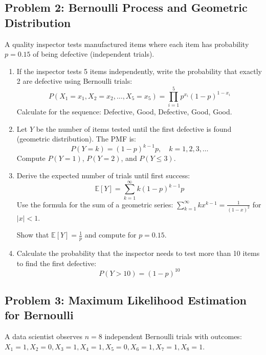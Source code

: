 \documentclass[12pt]{article}
\begin{document}
\subsection*{Problem 2: Bernoulli Process and Geometric Distribution}

A quality inspector tests manufactured items where each item has probability \(p = 0.15\) of being defective (independent trials).

\begin{enumerate}[label=(\alph*)]
\item If the inspector tests 5 items independently, write the probability that exactly 2 are defective using Bernoulli trials:
\[
P(X_1 = x_1, X_2 = x_2, \ldots, X_5 = x_5) = \prod_{i=1}^{5} p^{x_i}(1-p)^{1-x_i}
\]
Calculate for the sequence: Defective, Good, Defective, Good, Good.

\item Let \(Y\) be the number of items tested until the first defective is found (geometric distribution). The PMF is:
\[
P(Y = k) = (1-p)^{k-1}p, \quad k = 1, 2, 3, \ldots
\]
Compute \(P(Y = 1)\), \(P(Y = 2)\), and \(P(Y \leq 3)\).

\item Derive the expected number of trials until first success:
\[
\mathbb{E}[Y] = \sum_{k=1}^{\infty} k(1-p)^{k-1}p
\]
Use the formula for the sum of a geometric series: \(\sum_{k=1}^{\infty} kx^{k-1} = \frac{1}{(1-x)^2}\) for \(|x| < 1\).

Show that \(\mathbb{E}[Y] = \frac{1}{p}\) and compute for \(p = 0.15\).

\item Calculate the probability that the inspector needs to test more than 10 items to find the first defective:
\[
P(Y > 10) = (1-p)^{10}
\]
\end{enumerate}

\subsection*{Problem 3: Maximum Likelihood Estimation for Bernoulli}

A data scientist observes \(n = 8\) independent Bernoulli trials with outcomes: \(X_1 = 1, X_2 = 0, X_3 = 1, X_4 = 1, X_5 = 0, X_6 = 1, X_7 = 1, X_8 = 1\).
\end{document}
